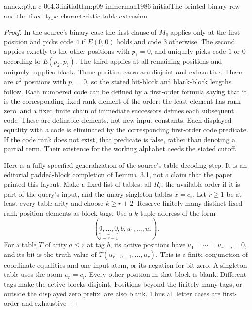 \begin{annexitem}{annex:p9.n-c-004.3.initial}{thm:p09-immerman1986-initial}{The printed binary row and the fixed-type characteristic-table extension}
\begin{proof}
In the source's binary case the first clause of \(M_0\) applies only
at the first position and picks code \(4\) if \(E(0,0)\) holds
and code \(3\) otherwise.  The second applies exactly to the other
positions with \(p_1=0\), and uniquely picks code \(1\) or
\(0\) according to \(E(p_2,p_3)\).  The third applies at
all remaining positions and uniquely supplies blank.  These position
cases are disjoint and exhaustive.  There are \(n^2\) positions
with \(p_1=0\), so the stated bit-block and blank-block lengths
follow.  Each numbered code can be defined by a first-order formula
saying that it is the corresponding fixed-rank element of the order:
the least element has rank zero, and a fixed finite chain of immediate
successors defines each subsequent code.  These are definable elements,
not new input constants.  Each displayed equality with a code is eliminated
by the corresponding first-order code predicate.  If the code rank
does not exist, that predicate is false, rather than denoting a partial
term.  Their existence for the working alphabet needs the stated cutoff.

Here is a fully specified generalization of the source's table-decoding
step.  It is an editorial padded-block completion of Lemma~3.1, not a
claim that the paper printed this layout.  Make a fixed list of tables:
all \(R_i\), the available order if it is part of the query's input,
and the unary singleton tables \(x=c_i\).  Let \(r\geq1\)
be at least every table arity and choose \(k\geq r+2\).
Reserve finitely many distinct fixed-rank position elements as block
tags.  Use a \(k\)-tuple address of the form
\[
 (\underbrace{0,\ldots,0}_{k-r-1},b,u_1,\ldots,u_r).
\]
For a table \(T\) of arity \(a\leq r\) at tag \(b\), its
active positions have \(u_1=\cdots=u_{r-a}=0\), and its bit is
the truth value of \(T(u_{r-a+1},\ldots,u_r)\).
This is a finite conjunction of coordinate equalities and one input
atom, or its negation for bit zero.  A singleton table uses the atom
\(u_r=c_i\).  Every other position in that block is blank.
Different tags make the active blocks disjoint.  Positions beyond the
finitely many tags, or outside the displayed zero prefix, are also blank.
Thus all letter cases are first-order and exhaustive.


\end{proof}
\end{annexitem}
